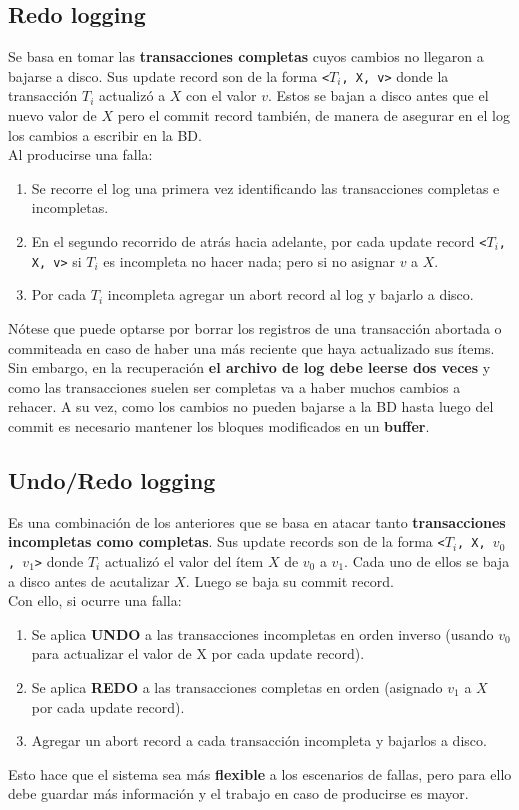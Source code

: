 \subsection*{Redo logging}
Se basa en tomar las \textbf{transacciones completas} cuyos cambios no llegaron a bajarse a disco. Sus update record son de la forma \texttt{<$T_i$, X, v>} donde la transacción $T_i$ actualizó a $X$ con el valor $v$. Estos se bajan a disco antes que el nuevo valor de $X$ pero el commit record también, de manera de asegurar en el log los cambios a escribir en la BD. \\
Al producirse una falla:
\begin{enumerate}
    \item Se recorre el log una primera vez identificando las transacciones completas e incompletas.
    \item En el segundo recorrido de atrás hacia adelante, por cada update record \texttt{<$T_i$, X, v>} si $T_i$ es incompleta no hacer nada; pero si no asignar $v$ a $X$.
    \item Por cada $T_i$ incompleta agregar un abort record al log y bajarlo a disco.
\end{enumerate}
Nótese que puede optarse por borrar los registros de una transacción abortada o commiteada en caso de haber una más reciente que haya actualizado sus ítems. Sin embargo, en la recuperación \textbf{el archivo de log debe leerse dos veces} y como las transacciones suelen ser completas va a haber muchos cambios a rehacer. A su vez, como los cambios no pueden bajarse a la BD hasta luego del commit es necesario mantener los bloques modificados en un \textbf{buffer}.

\subsection*{Undo/Redo logging}
Es una combinación de los anteriores que se basa en atacar tanto \textbf{transacciones incompletas como completas}. Sus update records son de la forma \texttt{<$T_i$, X, $v_0$, $v_1$>} donde $T_i$ actualizó el valor del ítem $X$ de $v_0$ a $v_1$. Cada uno de ellos se baja a disco antes de acutalizar $X$. Luego se baja su commit record. \\
Con ello, si ocurre una falla:
\begin{enumerate}
    \item Se aplica \textbf{UNDO} a las transacciones incompletas en orden inverso (usando $v_0$ para actualizar el valor de X por cada update record).
    \item Se aplica \textbf{REDO} a las transacciones completas en orden (asignado $v_1$ a $X$ por cada update record).
    \item Agregar un abort record a cada transacción incompleta y bajarlos a disco.
\end{enumerate}
Esto hace que el sistema sea más \textbf{flexible} a los escenarios de fallas, pero para ello debe guardar más información y el trabajo en caso de producirse es mayor.

